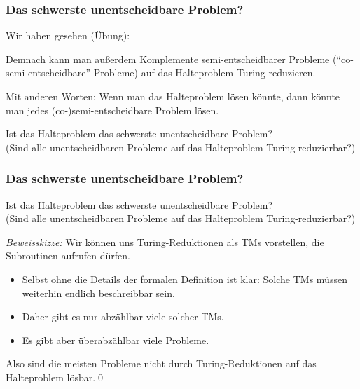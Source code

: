 \documentclass[aspectratio=1610,onlymath]{beamer}
\begin{document}
\begin{frame}\frametitle{Das schwerste unentscheidbare Problem?}

Wir haben gesehen (Übung):\smallskip

\medskip\pause

Demnach kann man außerdem Komplemente semi-entscheidbarer Probleme ("`co-semi-entscheidbare"' Probleme) auf das Halteproblem Turing-reduzieren.\bigskip

Mit anderen Worten: Wenn man das Halteproblem lösen könnte, dann könnte man
jedes (co-)semi-entscheidbare Problem lösen.\pause

\begin{center}
\alert{Ist das Halteproblem das schwerste unentscheidbare Problem?}\\
{\tiny (Sind alle unentscheidbaren Probleme auf das Halteproblem Turing-reduzierbar?)}
\end{center}

\end{frame}

\begin{frame}\frametitle{Das schwerste unentscheidbare Problem?}

\begin{center}
\alert{Ist das Halteproblem das schwerste unentscheidbare Problem?}\\
{\tiny (Sind alle unentscheidbaren Probleme auf das Halteproblem Turing-reduzierbar?)}
\end{center}

\bigskip
\pause {}
\bigskip\pause

\emph{Beweisskizze:} Wir können uns Turing-Reduktionen als TMs vorstellen, die Subroutinen
aufrufen dürfen.

\begin{itemize}
\item Selbst ohne die Details der formalen Definition ist klar: Solche TMs müssen weiterhin
endlich beschreibbar sein.
\item Daher gibt es nur abzählbar viele solcher TMs.
\item Es gibt aber überabzählbar viele Probleme.
\end{itemize}

Also sind die meisten Probleme nicht durch Turing-Reduktionen auf das Halteproblem
lösbar.\qed

\end{frame}
\end{document}
